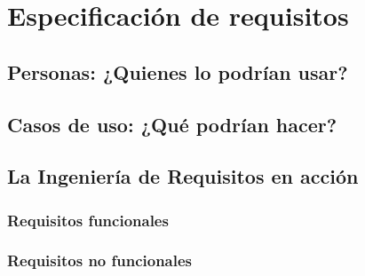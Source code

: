 \chapter{Especificación de requisitos}

\noindent{}

\section{Personas: ¿Quienes lo podrían usar?}

\section{Casos de uso: ¿Qué podrían hacer?}

\section{La Ingeniería de Requisitos en acción}

\subsection{Requisitos funcionales}

\subsection{Requisitos no funcionales}